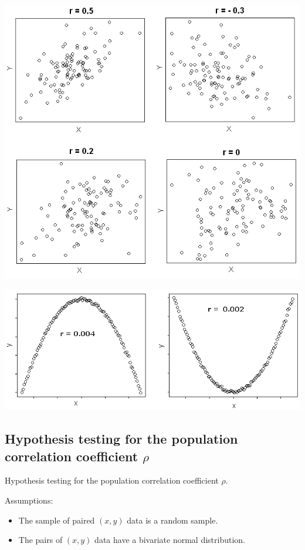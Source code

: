 \documentclass[
]{article}
\providecommand{\tightlist}{%
  \setlength{\itemsep}{0pt}\setlength{\parskip}{0pt}}
\begin{document}
\begin{center}\includegraphics[width=0.6\linewidth,height=0.6\textheight]{figures/rr2} \end{center}

\begin{center}\includegraphics[width=0.6\linewidth,height=0.6\textheight]{figures/corr0} \end{center}

\hypertarget{hypothesis-testing-for-the-population-correlation-coefficient-rho}{%
\subsection{\texorpdfstring{Hypothesis testing for the population
correlation coefficient
\(\rho\)}{Hypothesis testing for the population correlation coefficient \textbackslash rho}}\label{hypothesis-testing-for-the-population-correlation-coefficient-rho}}

Hypothesis testing for the population correlation coefficient \(\rho\).

Assumptions:

\begin{itemize}
\tightlist
\item
  The sample of paired \((x, y)\) data is a random sample.
\item
  The pairs of \((x, y)\) data have a bivariate normal distribution.
\end{itemize}
\end{document}
